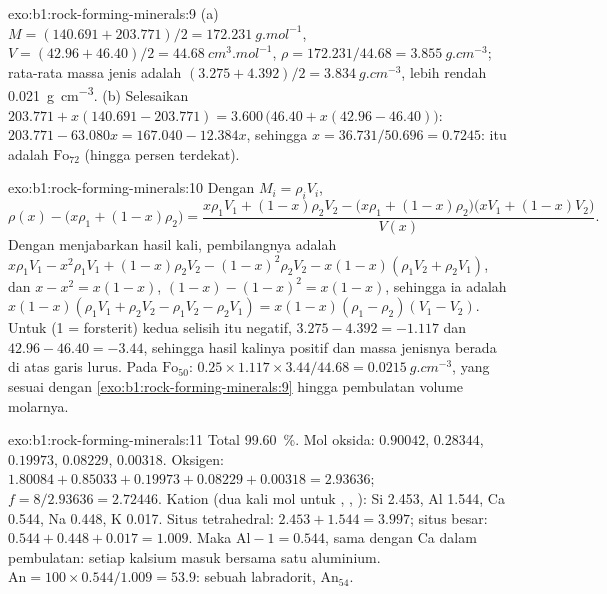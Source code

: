 \begin{solution}{exo:b1:rock-forming-minerals:9}
(a) $M = (140.691 + 203.771)/2 = \qty{172.231}{g.mol^{-1}}$, $V = (42.96 +
46.40)/2 = \qty{44.68}{cm^3.mol^{-1}}$, $\rho = 172.231/44.68 =
\qty{3.855}{g.cm^{-3}}$; rata-rata massa jenis adalah $(3.275 + 4.392)/2 =
\qty{3.834}{g.cm^{-3}}$, lebih rendah \qty{0.021}{g.cm^{-3}}. (b) Selesaikan
$203.771 + x(140.691 - 203.771) = 3.600\,\bigl(46.40 + x(42.96 - 46.40)\bigr)$:
$203.771 - 63.080x = 167.040 - 12.384x$, sehingga $x = 36.731/50.696 = 0.7245$:  itu adalah $\text{Fo}_{72}$ (hingga persen terdekat).
\end{solution}

\begin{solution}{exo:b1:rock-forming-minerals:10}
Dengan $M_i = \rho_i V_i$,
\[
  \rho(x) - \bigl(x\rho_1 + (1 - x)\rho_2\bigr)
  = \frac{x\rho_1V_1 + (1 - x)\rho_2V_2 - \bigl(x\rho_1 + (1 - x)\rho_2\bigr)\bigl(xV_1 + (1 - x)V_2\bigr)}{V(x)} .
\]
Dengan menjabarkan hasil kali, pembilangnya adalah $x\rho_1V_1 - x^2\rho_1V_1 +
(1 - x)\rho_2V_2 - (1 - x)^2\rho_2V_2 - x(1 - x)(\rho_1V_2 + \rho_2V_1)$, dan
$x - x^2 = x(1 - x)$, $(1 - x) - (1 - x)^2 = x(1 - x)$, sehingga ia adalah
$x(1 - x)(\rho_1V_1 + \rho_2V_2 - \rho_1V_2 - \rho_2V_1) =
x(1 - x)(\rho_1 - \rho_2)(V_1 - V_2)$. Untuk  (1 = forsterit) kedua
selisih itu negatif, $3.275 - 4.392 = -1.117$ dan $42.96 - 46.40 =
-3.44$, sehingga hasil kalinya positif dan massa jenisnya berada di atas garis lurus. Pada $\text{Fo}_{50}$: $0.25\times1.117\times3.44/44.68 =
\qty{0.0215}{g.cm^{-3}}$, yang sesuai dengan \cref{exo:b1:rock-forming-minerals:9} hingga pembulatan volume molarnya.
\end{solution}

\begin{solution}{exo:b1:rock-forming-minerals:11}
Total \qty{99.60}{\percent}. Mol oksida:  $0.90042$,
 $0.28344$,  $0.19973$,  $0.08229$,
 $0.00318$. Oksigen: $1.80084 + 0.85033 + 0.19973 + 0.08229 +
0.00318 = 2.93636$; $f = 8/2.93636 = 2.72446$. Kation (dua kali mol untuk
, , ): Si \num{2.453}, Al \num{1.544}, Ca
\num{0.544}, Na \num{0.448}, K \num{0.017}. Situs tetrahedral:
$2.453 + 1.544 = 3.997$; situs besar: $0.544 + 0.448 + 0.017 = 1.009$. Maka
$\mathrm{Al} - 1 = 0.544$, sama dengan Ca dalam pembulatan: setiap kalsium masuk bersama satu aluminium. $\mathrm{An} = 100\times0.544/1.009 = 53.9$: sebuah
labradorit, $\text{An}_{54}$.
\end{solution}


